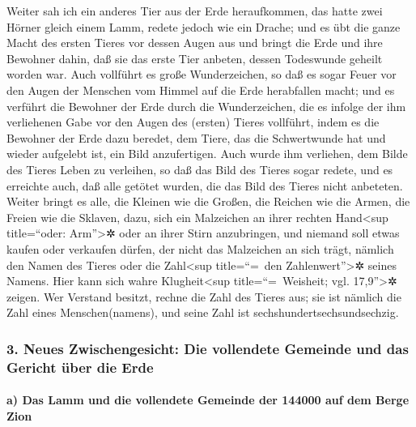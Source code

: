  Weiter sah ich ein anderes Tier aus der Erde
heraufkommen, das hatte zwei Hörner gleich einem Lamm, redete jedoch wie
ein Drache;  und es übt die ganze Macht des ersten Tieres
vor dessen Augen aus und bringt die Erde und ihre Bewohner dahin, daß
sie das erste Tier anbeten, dessen Todeswunde geheilt worden war.
 Auch vollführt es große Wunderzeichen, so daß es sogar
Feuer vor den Augen der Menschen vom Himmel auf die Erde herabfallen
macht;  und es verführt die Bewohner der Erde durch die
Wunderzeichen, die es infolge der ihm verliehenen Gabe vor den Augen des
(ersten) Tieres vollführt, indem es die Bewohner der Erde dazu beredet,
dem Tiere, das die Schwertwunde hat und wieder aufgelebt ist, ein Bild
anzufertigen.  Auch wurde ihm verliehen, dem Bilde des
Tieres Leben zu verleihen, so daß das Bild des Tieres sogar redete, und
es erreichte auch, daß alle getötet wurden, die das Bild des Tieres
nicht anbeteten.  Weiter bringt es alle, die Kleinen wie
die Großen, die Reichen wie die Armen, die Freien wie die Sklaven, dazu,
sich ein Malzeichen an ihrer rechten Hand\textless sup title=``oder:
Arm''\textgreater✲ oder an ihrer Stirn anzubringen,  und
niemand soll etwas kaufen oder verkaufen dürfen, der nicht das
Malzeichen an sich trägt, nämlich den Namen des Tieres oder die
Zahl\textless sup title=``=~den Zahlenwert''\textgreater✲ seines Namens.
 Hier kann sich wahre Klugheit\textless sup
title=``=~Weisheit; vgl. 17,9''\textgreater✲ zeigen. Wer Verstand
besitzt, rechne die Zahl des Tieres aus; sie ist nämlich die Zahl eines
Menschen(namens), und seine Zahl ist sechshundertsechsundsechzig.

\hypertarget{neues-zwischengesicht-die-vollendete-gemeinde-und-das-gericht-uxfcber-die-erde}{%
\subsubsection{3. Neues Zwischengesicht: Die vollendete Gemeinde und das
Gericht über die
Erde}\label{neues-zwischengesicht-die-vollendete-gemeinde-und-das-gericht-uxfcber-die-erde}}

\hypertarget{a-das-lamm-und-die-vollendete-gemeinde-der-144000-auf-dem-berge-zion}{%
\paragraph{a) Das Lamm und die vollendete Gemeinde der 144000 auf dem
Berge
Zion}\label{a-das-lamm-und-die-vollendete-gemeinde-der-144000-auf-dem-berge-zion}}

